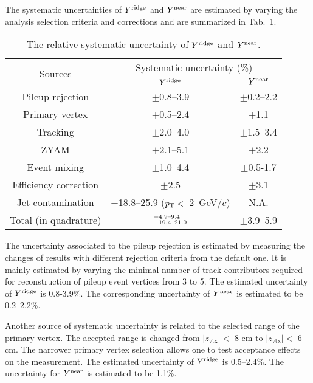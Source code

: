 The systematic uncertainties of $Y^{\rm{ridge}}$ and $Y^{\rm{near}}$ are estimated by varying the analysis selection criteria and corrections and are summarized in Tab.~\ref{tab:syst}.

\begin{table}[h!]
\caption{The relative systematic uncertainty of $Y^{\rm{ridge}}$ and $Y^{\rm{near}}$. }
\centering
\begin{tabular}{c|cc}
\hline 
\multirow{2}{*}{Sources}  & \multicolumn{2}{c}{Systematic uncertainty (\%)} \\\cline{2-3} 
         & $Y^{\rm{ridge}}$ & $Y^{\rm{near}}$ \\ \hline 
Pileup rejection    	& $\pm$0.8--3.9    &$\pm$0.2--2.2	\\ 
Primary vertex	        & $\pm$0.5--2.4	   &$\pm$1.1	\\ 
Tracking		        & $\pm$2.0--4.0    &$\pm$1.5--3.4	\\ 
ZYAM		        	& $\pm$2.1--5.1	   &$\pm$2.2	\\ 
Event mixing	    	& $\pm$1.0--4.4	   &$\pm$0.5-1.7	\\ 
Efficiency correction	& $\pm$2.5 	    &$\pm$3.1	\\  
Jet contamination   	& $-$18.8--25.9 ($p_\mathrm{T}<$~2~GeV/$c$)	&N.A.	\\ \hline 
Total (in quadrature)			& $^{+\rm{4.9}\textrm{--}\rm{9.4}}_{-\rm{19.4}\textrm{--}\rm{21.0}}$ & $\pm$3.9--5.9 \\ 
\hline 
\end{tabular}
\label{tab:syst}
\end{table}

The uncertainty associated to the pileup rejection is estimated by measuring the changes of results with different rejection criteria from the default one. It is mainly estimated by varying the minimal number of track contributors required for reconstruction of pileup event vertices from 3 to 5. The estimated uncertainty of $Y^{\rm{ridge}}$ is 0.8-3.9\%. The corresponding uncertainty of $Y^{\rm{near}}$ is estimated to be 0.2--2.2\%.
 
Another source of systematic uncertainty is related to the selected range of the primary vertex. The accepted range is changed from $|z_\mathrm{vtx}|<$ 8 cm to $|z_\mathrm{vtx}|<$ 6 cm. The narrower primary vertex selection allows one to test acceptance effects on the measurement. The estimated uncertainty of $Y^{\rm{ridge}}$ is 0.5--2.4\%. The uncertainty for $Y^{\rm{near}}$ is estimated to be 1.1\%.

